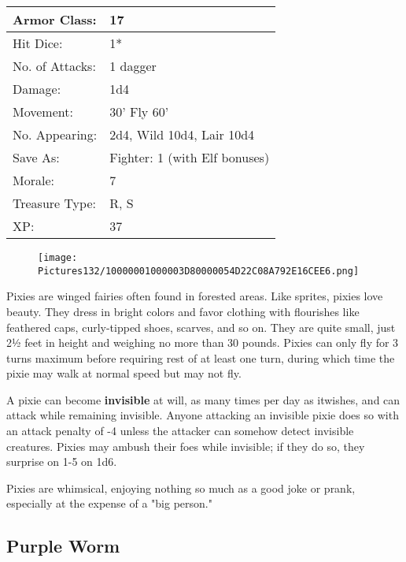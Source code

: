 \documentclass[a4paper,twoside,openany,10pt]{book}
\begin{document}
\begin{multicols}{2}
\begin{tabularx}{0.50\textwidth}{@{}lX@{}}
Armor Class: & 17 \\\hline
Hit Dice: & 1* \\\hline
No. of Attacks: & 1 dagger \\\hline
Damage: & 1d4 \\\hline
Movement: & 30' Fly 60' \\\hline
No. Appearing: & 2d4, Wild 10d4, Lair 10d4 \\\hline
Save As: & Fighter: 1 (with Elf bonuses) \\\hline
Morale: & 7 \\\hline
Treasure Type: & R, S \\\hline
XP: & 37 \\\hline
\end{tabularx}\medskip

\begin{wrapfigure}{l}{0.25\textwidth}
 \texttt{[image: Pictures132/10000001000003D80000054D22C08A792E16CEE6.png]} 
\end{wrapfigure}

Pixies are winged fairies often found in forested areas. Like sprites, pixies love beauty. They dress in bright colors and favor clothing with flourishes like feathered caps, curly-tipped shoes, scarves, and so on. They are quite small, just 2½ feet in height and weighing no more than 30 pounds. Pixies can only fly for 3 turns maximum before requiring rest of at least one turn, during which time the pixie may walk at normal speed but may not fly.

A pixie can become \textbf{invisible }at will, as many times per day as itwishes, and can attack while remaining invisible. Anyone attacking an invisible pixie does so with an attack penalty of -4 unless the attacker can somehow detect invisible creatures. Pixies may ambush their foes while invisible; if they do so, they surprise on 1-5 on 1d6. 

Pixies are whimsical, enjoying nothing so much as a good joke or prank, especially at the expense of a "big person."

\subsection*{Purple Worm}\label{purple-worm}


\end{multicols}
\end{document}

